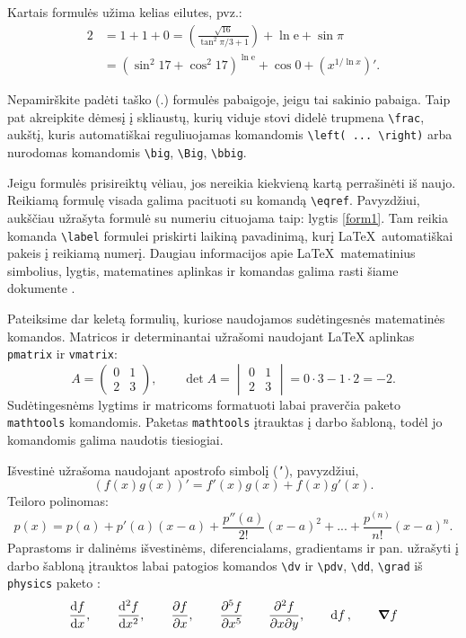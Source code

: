 \documentclass[]{VUMIFTemplateClass}
\newcommand{\ee}{{\mathrm e}}  %
\begin{document}
Kartais formulės užima kelias eilutes, pvz.:
\begin{equation}
\begin{split}
2&= 1+1+0=\left(\frac{\sqrt{16}}{\tan^2\pi/3+1}\right) +\ln\ee+\sin\pi\\
&= (\sin^2 17+\cos^2 17)^{\ln\ee}+\cos 0 +(x^{1/\ln x})'. 
\label{form1}
\end{split}
\end{equation}

Nepamirškite padėti taško ($.$) formulės pabaigoje, jeigu tai sakinio pabaiga. Taip pat akreipkite dėmesį į skliaustų, kurių viduje stovi didelė trupmena \texttt{\textbackslash frac}, aukštį, kuris automatiškai reguliuojamas komandomis \texttt{\textbackslash left( ... \textbackslash right)} arba nurodomas komandomis \texttt{\textbackslash big}, \texttt{\textbackslash Big}, \texttt{\textbackslash bbig}.

\bigskip

Jeigu formulės prisireiktų vėliau, jos nereikia kiekvieną kartą perrašinėti iš naujo. Reikiamą formulę visada galima pacituoti su komandą \texttt{\textbackslash eqref}. Pavyzdžiui, aukščiau užrašyta formulė su numeriu cituojama taip: lygtis \eqref{form1}. Tam reikia komanda \texttt{\textbackslash  label} formulei priskirti laikiną pavadinimą, kurį \LaTeX~automatiškai pakeis į reikiamą numerį. Daugiau informacijos apie \LaTeX~matematinius simbolius, lygtis, matematines aplinkas ir komandas galima rasti šiame dokumente \cite{amsdoc}.

\bigskip

Pateiksime dar keletą formulių, kuriose naudojamos sudėtingesnės matematinės komandos. Matricos ir determinantai užrašomi naudojant LaTeX aplinkas \texttt{pmatrix} ir \texttt{vmatrix}:
\[
A= \begin{pmatrix}
    0 & 1\\
    2 & 3
\end{pmatrix}, \qquad
\det A =
\begin{vmatrix}
0 & 1\\
2 & 3    
\end{vmatrix} = 0 \cdot 3 - 1 \cdot 2 = -2.
\]
Sudėtingesnėms lygtims ir matricoms formatuoti labai praverčia paketo \texttt{mathtools} \cite{mtoolsdoc} komandomis. Paketas \texttt{mathtools} įtrauktas į darbo šabloną, todėl jo komandomis galima naudotis tiesiogiai.

Išvestinė užrašoma naudojant apostrofo simbolį (\texttt{'}), pavyzdžiui,
\[
(f(x)g(x))' = f'(x)g(x) + f(x)g'(x).
\]
Teiloro polinomas:
\[
p(x) = p(a) + p'(a)(x-a)+\frac{p''(a)}{2!}(x-a)^2 + ... + \frac{p^{(n)}}{n!}(x-a)^n.
\]
Paprastoms ir dalinėms išvestinėms, diferencialams, gradientams ir pan. užrašyti į darbo šabloną įtrauktos labai patogios komandos \texttt{\textbackslash dv} ir \texttt{\textbackslash pdv}, \texttt{\textbackslash dd}, \texttt{\textbackslash grad} iš \texttt{physics} paketo \cite{physdoc}:
\[
\dv{f}{x},  \qquad
\dv[2]{f}{x}, \qquad
\pdv{f}{x},  \qquad
\pdv[5]{f}{x} \qquad
\pdv{f}{x}{y}, \qquad
\dd{f}, \qquad
\grad{f}
\]
\end{document}
